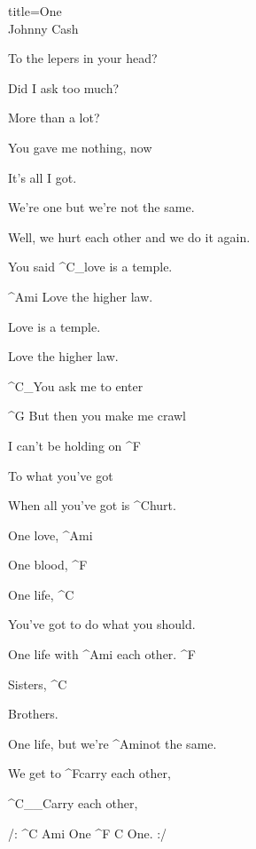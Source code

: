 \begin{song}{title=\centering One \\\normalsize Johnny Cash  \vspace*{-0.3cm}}
{\begin{minipage}[t]{0.55\textwidth}
	To the lepers in your head?


\end{minipage}\begin{minipage}[t]{0.55\textwidth}\setlength{\parindent}{0.45cm}\vspace*{0.55cm}  %


	Did I ask too much? 

	More than a lot?

	You gave me nothing, now
	   
	It's all I got.

	We're one but we're not the same.

	Well, we hurt each other and we do it again. 
 
	You said ^{C{\color{white}\_}}love is a temple.

	^{Ami\,\,}Love the higher law.

	Love is a temple.	

	Love the higher law.

	^{C{\color{white}\_}}You ask me to enter

	^{G\,\,}But then you make me crawl

	I can't be holding on ^{F}
                  
	To what you've got

	When all you've got is ^{C}hurt.
  
	One love, ^{Ami}

	One blood, ^{F}

	One life, ^{C}
 
	You've got to do what you should.

	One life with ^{Ami\,\,}each other. ^{F}
 
 	Sisters, ^{C}
 
	Brothers.
   
	One life, but we're ^{Ami}not the same.

	We get to ^{F}carry each other,

  	^{C{\color{white}\_\_}}Carry each other,

  	/: ^{C\,\,Ami\,\,}One ^{F\,\,C\,\,}One. :/


\normalsize


\end{minipage}
}
\setcounter{Slokočet}{0}
\end{song}
